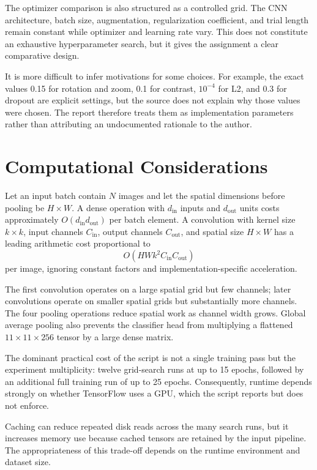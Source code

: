 \documentclass[11pt,a4paper]{article}
\begin{document}
The optimizer comparison is also structured as a controlled grid. The CNN architecture, batch size, augmentation, regularization coefficient, and trial length remain constant while optimizer and learning rate vary. This does not constitute an exhaustive hyperparameter search, but it gives the assignment a clear comparative design.

It is more difficult to infer motivations for some choices. For example, the exact values 0.15 for rotation and zoom, 0.1 for contrast, $10^{-4}$ for L2, and 0.3 for dropout are explicit settings, but the source does not explain why those values were chosen. The report therefore treats them as implementation parameters rather than attributing an undocumented rationale to the author.

\section{Computational Considerations}
Let an input batch contain $N$ images and let the spatial dimensions before pooling be $H\times W$. A dense operation with $d_{\mathrm{in}}$ inputs and $d_{\mathrm{out}}$ units costs approximately $O(d_{\mathrm{in}}d_{\mathrm{out}})$ per batch element. A convolution with kernel size $k\times k$, input channels $C_{\mathrm{in}}$, output channels $C_{\mathrm{out}}$, and spatial size $H\times W$ has a leading arithmetic cost proportional to
\begin{equation}
O\!\left(HWk^2C_{\mathrm{in}}C_{\mathrm{out}}\right)
\end{equation}
per image, ignoring constant factors and implementation-specific acceleration.

The first convolution operates on a large spatial grid but few channels; later convolutions operate on smaller spatial grids but substantially more channels. The four pooling operations reduce spatial work as channel width grows. Global average pooling also prevents the classifier head from multiplying a flattened $11\times11\times256$ tensor by a large dense matrix.

The dominant practical cost of the script is not a single training pass but the experiment multiplicity: twelve grid-search runs at up to 15 epochs, followed by an additional full training run of up to 25 epochs. Consequently, runtime depends strongly on whether TensorFlow uses a GPU, which the script reports but does not enforce.

Caching can reduce repeated disk reads across the many search runs, but it increases memory use because cached tensors are retained by the input pipeline. The appropriateness of this trade-off depends on the runtime environment and dataset size.
\end{document}
